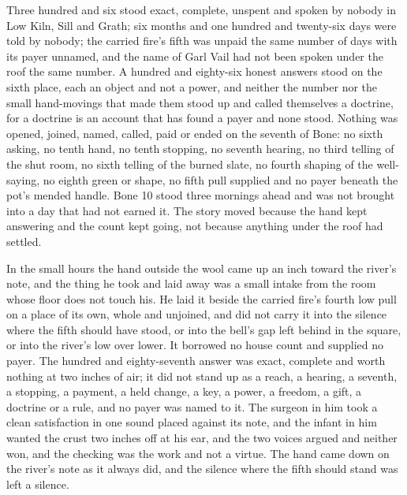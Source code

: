 Three hundred and six stood exact, complete, unspent and spoken by nobody in Low Kiln, Sill and Grath; six months and one hundred and twenty-six days were told by nobody; the carried fire's fifth was unpaid the same number of days with its payer unnamed, and the name of Garl Vail had not been spoken under the roof the same number. A hundred and eighty-six honest answers stood on the sixth place, each an object and not a power, and neither the number nor the small hand-movings that made them stood up and called themselves a doctrine, for a doctrine is an account that has found a payer and none stood. Nothing was opened, joined, named, called, paid or ended on the seventh of Bone: no sixth asking, no tenth hand, no tenth stopping, no seventh hearing, no third telling of the shut room, no sixth telling of the burned slate, no fourth shaping of the well-saying, no eighth green or shape, no fifth pull supplied and no payer beneath the pot's mended handle. Bone 10 stood three mornings ahead and was not brought into a day that had not earned it. The story moved because the hand kept answering and the count kept going, not because anything under the roof had settled.

In the small hours the hand outside the wool came up an inch toward the river's note, and the thing he took and laid away was a small intake from the room whose floor does not touch his. He laid it beside the carried fire's fourth low pull on a place of its own, whole and unjoined, and did not carry it into the silence where the fifth should have stood, or into the bell's gap left behind in the square, or into the river's low over lower. It borrowed no house count and supplied no payer. The hundred and eighty-seventh answer was exact, complete and worth nothing at two inches of air; it did not stand up as a reach, a hearing, a seventh, a stopping, a payment, a held change, a key, a power, a freedom, a gift, a doctrine or a rule, and no payer was named to it. The surgeon in him took a clean satisfaction in one sound placed against its note, and the infant in him wanted the crust two inches off at his ear, and the two voices argued and neither won, and the checking was the work and not a virtue. The hand came down on the river's note as it always did, and the silence where the fifth should stand was left a silence.
